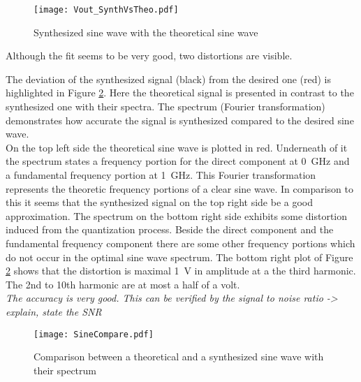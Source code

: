 \begin{figure}[htb!]
   \centering
   \texttt{[image: Vout\_SynthVsTheo.pdf]}
   \caption{Synthesized sine wave with the theoretical sine wave}
   \label{fig:SineWaveSynthVsTheoretical}
\end{figure}

Although the fit seems to be very good, two distortions are visible. 

The deviation of the synthesized signal (black) from the desired one (red) is highlighted in Figure \ref{fig:SineCompare}.
Here the theoretical signal is presented in contrast to the synthesized one with their spectra.
The spectrum (Fourier transformation) demonstrates how accurate the signal is synthesized compared to the desired sine wave.\\
On the top left side the theoretical sine wave is plotted in red. Underneath of it the spectrum states a frequency portion for the direct component at \SI{0} {\GHz} and a fundamental frequency portion at \SI{1}{\GHz}.
This Fourier transformation represents the theoretic frequency portions of a clear sine wave. 
In comparison to this it seems that the synthesized signal on the top right side be a good approximation.
The spectrum on the bottom right side exhibits some distortion induced from the quantization process. 
Beside the direct component and the fundamental frequency component there are some other frequency portions which do not occur in the optimal sine wave spectrum.
The bottom right plot of Figure \ref{fig:SineCompare} shows that the distortion is maximal \SI{1}{\volt} in amplitude at a the third harmonic. The 2nd to 10th harmonic are at most a half of a volt.\\
\textit{The accuracy is very good. This can be verified by the signal to noise ratio -> explain, state the SNR}

\begin{figure}[htb!]
	\centering
  \texttt{[image: SineCompare.pdf]}
	\caption{Comparison between a theoretical and a synthesized sine wave with their spectrum}
	\label{fig:SineCompare}
\end{figure}

